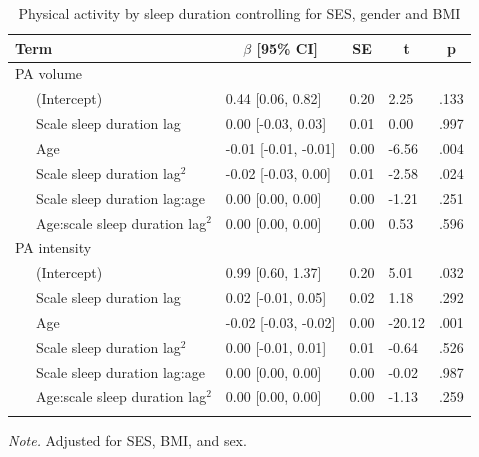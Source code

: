 \documentclass[
  man]{apa6}
\begin{document}
\begin{table}[tbp]

\begin{center}
\begin{threeparttable}

\caption{\label{tab:PA-by-sleep-duration}Physical activity  by sleep duration controlling for SES, gender and BMI}

\begin{tabular}{lllll}
\toprule
Term & \multicolumn{1}{c}{$\beta$ [95\% CI]} & \multicolumn{1}{c}{SE} & \multicolumn{1}{c}{t} & \multicolumn{1}{c}{p}\\
\midrule
PA volume &  &  &  & \\
\ \ \ (Intercept) & 0.44 [0.06, 0.82] & 0.20 & 2.25 & .133\\
\ \ \ Scale sleep duration lag & 0.00 [-0.03, 0.03] & 0.01 & 0.00 & .997\\
\ \ \ Age & -0.01 [-0.01, -0.01] & 0.00 & -6.56 & .004\\
\ \ \ Scale sleep duration lag$^2$ & -0.02 [-0.03, 0.00] & 0.01 & -2.58 & .024\\
\ \ \ Scale sleep duration lag:age & 0.00 [0.00, 0.00] & 0.00 & -1.21 & .251\\
\ \ \ Age:scale sleep duration lag$^2$ & 0.00 [0.00, 0.00] & 0.00 & 0.53 & .596\\
PA intensity &  &  &  & \\
\ \ \ (Intercept) & 0.99 [0.60, 1.37] & 0.20 & 5.01 & .032\\
\ \ \ Scale sleep duration lag & 0.02 [-0.01, 0.05] & 0.02 & 1.18 & .292\\
\ \ \ Age & -0.02 [-0.03, -0.02] & 0.00 & -20.12 & .001\\
\ \ \ Scale sleep duration lag$^2$ & 0.00 [-0.01, 0.01] & 0.01 & -0.64 & .526\\
\ \ \ Scale sleep duration lag:age & 0.00 [0.00, 0.00] & 0.00 & -0.02 & .987\\
\ \ \ Age:scale sleep duration lag$^2$ & 0.00 [0.00, 0.00] & 0.00 & -1.13 & .259\\
\bottomrule
\addlinespace
\end{tabular}

\begin{tablenotes}[para]
\normalsize{\textit{Note.} Adjusted for SES, BMI, and sex. }
\end{tablenotes}

\end{threeparttable}
\end{center}

\end{table}
\end{document}

